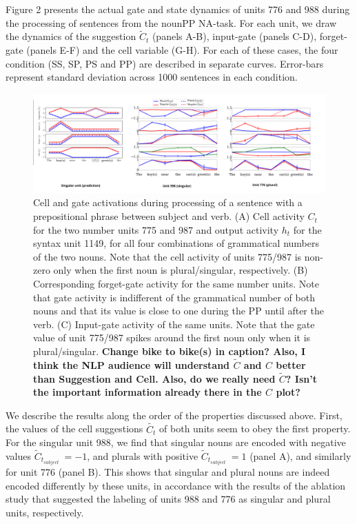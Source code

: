 Figure 2 presents the actual gate and state dynamics of units 776 and 988 during the processing of sentences from the nounPP NA-task. 
For each unit, we draw the dynamics of the suggestion $\tilde{C}_t$ (panels A-B), input-gate (panels C-D), forget-gate (panels E-F) and the cell variable (G-H). 
For each of these cases, the four condition (SS, SP, PS and PP) are described in separate curves. 
Error-bars represent standard deviation across 1000 sentences in each condition.

\begin{figure}[ht]
\includegraphics[width=\textwidth]{Figures/Figure2_cartoon_LR_units.png}
\caption{Cell and gate activations during processing of a sentence with a prepositional phrase between subject and verb. 
(A) Cell activity $C_t$ for the two number units 775 and 987 and output activity $h_t$ for the syntax unit 1149, for all four combinations of grammatical numbers of the two nouns. 
Note that the cell activity of units 775/987 is non-zero only when the first noun is plural/singular, respectively. 
(B) Corresponding forget-gate activity for the same number units. 
Note that gate activity is indifferent of the grammatical number of both nouns and that its value is close to one during the PP until after the verb. 
(C) Input-gate activity of the same units. 
Note that the gate value of unit 775/987 spikes around the first noun only when it is plural/singular. \textbf{Change bike to bike(s) in caption? Also, I think the NLP audience will understand $\tilde{C}$ and $C$ better than Suggestion and Cell. Also, do we really need  $\tilde{C}$? Isn't the important information already there in the $C$ plot?}}
\end{figure}


We describe the results along the order of the properties discussed above. 
First, the values of the cell suggestions $\tilde{C_t}$ of both units seem to obey the first property. 
For the singular unit 988, we find that singular nouns are encoded with negative values $\tilde{C}_{t_{subject}}~=-1$, and plurals with positive $\tilde{C}_{t_{subject}}~=1$ (panel A), and similarly for unit 776 (panel B). 
This shows that singular and plural nouns are indeed encoded differently by these units, in accordance with the results of the ablation study that suggested the labeling of units 988 and 776 as singular and plural units, respectively.


